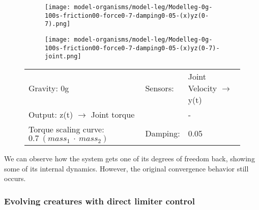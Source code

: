 \documentclass[main]{subfiles}
\begin{document}
\begin{figure}[H]
	\centering
		\begin{subfigure}[c]{0.45\textwidth}
	\texttt{[image: model-organisms/model-leg/Modelleg-0g-100s-friction00-force0-7-damping0-05-(x)yz(0-7).png]}
		\end{subfigure}
	\begin{subfigure}[c]{0.45\textwidth}
	\texttt{[image: model-organisms/model-leg/Modelleg-0g-100s-friction00-force0-7-damping0-05-(x)yz(0-7)-joint.png]}
		\end{subfigure}
	\caption[Limited chaotic controller controlling model leg]{}
	\begin{tabular}{l|ll}
	\hline 
	Gravity: 0g  & Sensors: & Joint Velocity \(\rightarrow\) y(t)\\
	 Output: z(t) \(\rightarrow\) Joint torque & & - \\
	  Torque scaling curve: \(0.7~(mass_1~\cdot~mass_2)\) & Damping: & 0.05 \\
	  \hline
	\end{tabular}

	\label{figure:limited-damped-model-leg8}
\end{figure}

We can observe how the system gets one of its degrees of freedom back, showing some of its internal dynamics. However, the original convergence behavior still occurs.


\subsubsection{Evolving creatures with direct limiter control}


\end{document}
